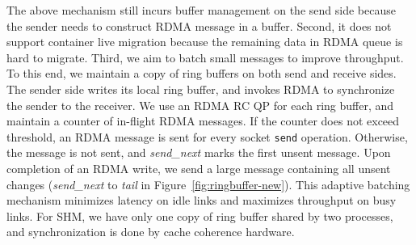 The above mechanism still incurs buffer management on the send side because the sender needs to construct RDMA message in a buffer.
Second, it does not support container live migration because the remaining data in RDMA queue is hard to migrate.
Third, we aim to batch small messages to improve throughput.
To this end, we maintain a copy of ring buffers on both send and receive sides.
The sender side writes its local ring buffer, and invokes RDMA to synchronize the sender to the receiver.
We use an RDMA RC QP for each ring buffer, and maintain a counter of in-flight RDMA messages.
If the counter does not exceed threshold, an RDMA message is sent for every socket \texttt{send} operation.
Otherwise, the message is not sent, and \emph{send\_next} marks the first unsent message.
Upon completion of an RDMA write, we send a large message containing all unsent changes (\emph{send\_next} to \emph{tail} in Figure~\ref{fig:ringbuffer-new}).
This adaptive batching mechanism minimizes latency on idle links and maximizes throughput on busy links.
For SHM, we have only one copy of ring buffer shared by two processes, and synchronization is done by cache coherence hardware.



